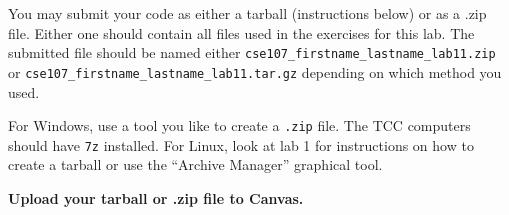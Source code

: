 \documentclass[11pt]{cselabheader}
\begin{document}
You may submit your code as either a tarball (instructions below) or as a .zip
file. Either one should contain all files used in the exercises for this lab.
The submitted file should be named either
\texttt{cse107\_firstname\_lastname\_lab11.zip} or
\texttt{cse107\_firstname\_lastname\_lab11.tar.gz} depending on which method you
used.

For Windows, use a tool you like to create a \texttt{.zip} file. The TCC
computers should have \texttt{7z} installed. For Linux, look at lab 1 for
instructions on how to create a tarball or use the ``Archive Manager'' graphical
tool.

\begin{center}
  \textbf{Upload your tarball or .zip file to Canvas.}
\end{center}
\end{document}
